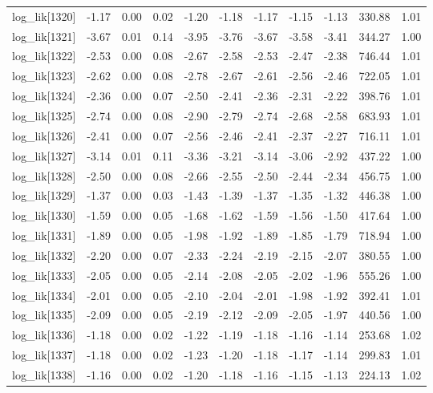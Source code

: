 \begin{table}[ht]
\begin{tabular}{rrrrrrrrrrr}
  log\_lik[1320] & -1.17 & 0.00 & 0.02 & -1.20 & -1.18 & -1.17 & -1.15 & -1.13 & 330.88 & 1.01 \\ 
  log\_lik[1321] & -3.67 & 0.01 & 0.14 & -3.95 & -3.76 & -3.67 & -3.58 & -3.41 & 344.27 & 1.00 \\ 
  log\_lik[1322] & -2.53 & 0.00 & 0.08 & -2.67 & -2.58 & -2.53 & -2.47 & -2.38 & 746.44 & 1.01 \\ 
  log\_lik[1323] & -2.62 & 0.00 & 0.08 & -2.78 & -2.67 & -2.61 & -2.56 & -2.46 & 722.05 & 1.01 \\ 
  log\_lik[1324] & -2.36 & 0.00 & 0.07 & -2.50 & -2.41 & -2.36 & -2.31 & -2.22 & 398.76 & 1.01 \\ 
  log\_lik[1325] & -2.74 & 0.00 & 0.08 & -2.90 & -2.79 & -2.74 & -2.68 & -2.58 & 683.93 & 1.01 \\ 
  log\_lik[1326] & -2.41 & 0.00 & 0.07 & -2.56 & -2.46 & -2.41 & -2.37 & -2.27 & 716.11 & 1.01 \\ 
  log\_lik[1327] & -3.14 & 0.01 & 0.11 & -3.36 & -3.21 & -3.14 & -3.06 & -2.92 & 437.22 & 1.00 \\ 
  log\_lik[1328] & -2.50 & 0.00 & 0.08 & -2.66 & -2.55 & -2.50 & -2.44 & -2.34 & 456.75 & 1.00 \\ 
  log\_lik[1329] & -1.37 & 0.00 & 0.03 & -1.43 & -1.39 & -1.37 & -1.35 & -1.32 & 446.38 & 1.00 \\ 
  log\_lik[1330] & -1.59 & 0.00 & 0.05 & -1.68 & -1.62 & -1.59 & -1.56 & -1.50 & 417.64 & 1.00 \\ 
  log\_lik[1331] & -1.89 & 0.00 & 0.05 & -1.98 & -1.92 & -1.89 & -1.85 & -1.79 & 718.94 & 1.00 \\ 
  log\_lik[1332] & -2.20 & 0.00 & 0.07 & -2.33 & -2.24 & -2.19 & -2.15 & -2.07 & 380.55 & 1.00 \\ 
  log\_lik[1333] & -2.05 & 0.00 & 0.05 & -2.14 & -2.08 & -2.05 & -2.02 & -1.96 & 555.26 & 1.00 \\ 
  log\_lik[1334] & -2.01 & 0.00 & 0.05 & -2.10 & -2.04 & -2.01 & -1.98 & -1.92 & 392.41 & 1.01 \\ 
  log\_lik[1335] & -2.09 & 0.00 & 0.05 & -2.19 & -2.12 & -2.09 & -2.05 & -1.97 & 440.56 & 1.00 \\ 
  log\_lik[1336] & -1.18 & 0.00 & 0.02 & -1.22 & -1.19 & -1.18 & -1.16 & -1.14 & 253.68 & 1.02 \\ 
  log\_lik[1337] & -1.18 & 0.00 & 0.02 & -1.23 & -1.20 & -1.18 & -1.17 & -1.14 & 299.83 & 1.01 \\ 
  log\_lik[1338] & -1.16 & 0.00 & 0.02 & -1.20 & -1.18 & -1.16 & -1.15 & -1.13 & 224.13 & 1.02 \\ 

\end{tabular}
\end{table}
